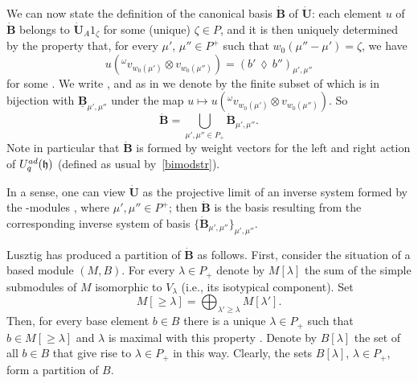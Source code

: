 \documentclass[11pt]{article}
\numberwithin{equation}{section}
\numberwithin{equation}{section}
\theoremstyle{definition}
\begin{document}
 We can now state the definition of the canonical basis $\dot{\mathbf{B}}$ of $\dot{\mathbf{U}}$: each element $u$ of $\dot{\mathbf{B}}$ belongs to $\dot{\mathbf{U}}_A 1_\zeta$ for some (unique) $\zeta\in P$, and it is then uniquely determined by the property that, for every $\mu'$, $\mu''\in P^+$ such that $w_0(\mu''-\mu')=\zeta$, we have
\begin{equation}\label{udef}
u({}^\omega v_{w_0(\mu')}\otimes v_{w_0(\mu'')}) = (b' \,\lozenge\, b'')_{\mu',\mu''}\end{equation}
for some  \cite[Section~25.2]{Lusztig}. We write , and as in \cite{Lusztig3} we denote by  the finite subset of  which is in bijection with $\underline{\mathbf{B}}_{\mu',\mu''}$ under the map $u\mapsto u({}^\omega v_{w_0(\mu')}\otimes v_{w_0(\mu'')})$. So
\begin{equation}\label{Bpointunion}
\dot{\mathbf{B}} =\bigcup_{\mu',\mu''\in P_+} \dot{\mathbf{B}}_{\mu',\mu''}.
\end{equation}
Note in particular that $\dot{\mathbf{B}}$ is formed by weight vectors for the left and right action of $U_q^{\rm ad}(\mathfrak{h})$ (defined as usual by~\eqref{bimodstr}).

In a sense, one can view $\dot{\mathbf{U}}$ as the projective limit of an inverse system formed by the -modules , where $\mu',\mu''\in P^+$; then $\dot{\mathbf{B}}$ is the basis resulting from the corresponding inverse system of basis $\{\dot{\mathbf{B}}_{\mu',\mu''}\}_{\mu',\mu''}$.


Lusztig has produced a partition of $\dot{\mathbf{B}}$ as follows. First, consider the situation of a based module $(M,B)$. For every $\lambda\in P_+$ denote by $M[\lambda]$ the sum of the simple submodules of $M$ isomorphic to $V_\lambda$ (i.e., its isotypical component). Set
\begin{equation}\label{decbaseisospace}
M[\geq\lambda] = \bigoplus_{\lambda'\geq \lambda} M[\lambda'].
\end{equation}
Then, for every base element $b\in B$ there is a unique $\lambda\in P_+$ such that $b\in M[\geq\lambda]$ and $\lambda$ is maximal with this property \cite[Section~27.2]{Lusztig}. Denote by $B[\lambda]$ the set of all $b\in B$ that give rise to $\lambda\in P_+$ in this way. Clearly, the sets $B[\lambda]$, $\lambda\in P_+$, form a partition of $B$.
\end{document}
